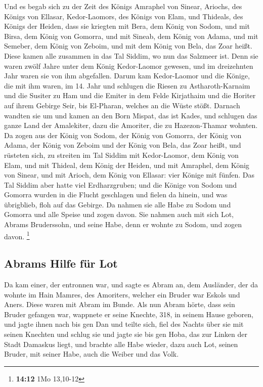  Und es begab sich zu der Zeit des Königs Amraphel von
Sinear, Ariochs, des Königs von Ellasar, Kedor-Laomors, des Königs von
Elam, und Thideals, des Königs der Heiden,  dass sie
kriegten mit Bera, dem König von Sodom, und mit Birsa, dem König von
Gomorra, und mit Sineab, dem König von Adama, und mit Semeber, dem König
von Zeboim, und mit dem König von Bela, das Zoar heißt. 
Diese kamen alle zusammen in das Tal Siddim, wo nun das Salzmeer ist.
 Denn sie waren zwölf Jahre unter dem König Kedor-Laomor
gewesen, und im dreizehnten Jahr waren sie von ihm abgefallen.
 Darum kam Kedor-Laomor und die Könige, die mit ihm waren,
im 14. Jahr und schlugen die Riesen zu Astharoth-Karnaim und die Susiter
zu Ham und die Emiter in dem Felde Kirjathaim  und die
Horiter auf ihrem Gebirge Seir, bis El-Pharan, welches an die Wüste
stößt.  Darnach wandten sie um und kamen an den Born
Mispat, das ist Kades, und schlugen das ganze Land der Amalekiter, dazu
die Amoriter, die zu Hazezon-Thamar wohnten.  Da zogen aus
der König von Sodom, der König von Gomorra, der König von Adama, der
König von Zeboim und der König von Bela, das Zoar heißt, und rüsteten
sich, zu streiten im Tal Siddim  mit Kedor-Laomor, dem
König von Elam, und mit Thideal, dem König der Heiden, und mit Amraphel,
dem König von Sinear, und mit Arioch, dem König von Ellasar: vier Könige
mit fünfen.  Das Tal Siddim aber hatte viel
Erdharzgruben; und die Könige von Sodom und Gomorra wurden in die Flucht
geschlagen und fielen da hinein, und was übrigblieb, floh auf das
Gebirge.  Da nahmen sie alle Habe zu Sodom und Gomorra
und alle Speise und zogen davon.  Sie nahmen auch mit
sich Lot, Abrams Bruderssohn, und seine Habe, denn er wohnte zu Sodom,
und zogen davon. \footnote{\textbf{14:12} 1Mo 13,10-12}

\hypertarget{abrams-hilfe-fuxfcr-lot}{%
\subsection{Abrams Hilfe für Lot}\label{abrams-hilfe-fuxfcr-lot}}

 Da kam einer, der entronnen war, und sagte es Abram an,
dem Ausländer, der da wohnte im Hain Mamres, des Amoriters, welcher ein
Bruder war Eskols und Aners. Diese waren mit Abram im Bunde.
 Als nun Abram hörte, dass sein Bruder gefangen war,
wappnete er seine Knechte, 318, in seinem Hause geboren, und jagte ihnen
nach bis gen Dan  und teilte sich, fiel des Nachts über
sie mit seinen Knechten und schlug sie und jagte sie bis gen Hoba, das
zur Linken der Stadt Damaskus liegt,  und brachte alle
Habe wieder, dazu auch Lot, seinen Bruder, mit seiner Habe, auch die
Weiber und das Volk.

